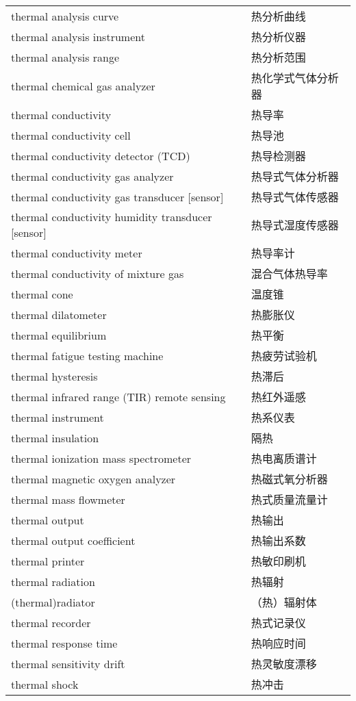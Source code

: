 \documentclass[
]{article}
\begin{document}
\begin{longtable}[]{@{}ll@{}}
thermal analysis curve & 热分析曲线 \\
thermal analysis instrument & 热分析仪器 \\
thermal analysis range & 热分析范围 \\
thermal chemical gas analyzer & 热化学式气体分析器 \\
thermal conductivity & 热导率 \\
thermal conductivity cell & 热导池 \\
thermal conductivity detector (TCD) & 热导检测器 \\
thermal conductivity gas analyzer & 热导式气体分析器 \\
thermal conductivity gas transducer {[}sensor{]} & 热导式气体传感器 \\
thermal conductivity humidity transducer {[}sensor{]} &
热导式湿度传感器 \\
thermal conductivity meter & 热导率计 \\
thermal conductivity of mixture gas & 混合气体热导率 \\
thermal cone & 温度锥 \\
thermal dilatometer & 热膨胀仪 \\
thermal equilibrium & 热平衡 \\
thermal fatigue testing machine & 热疲劳试验机 \\
thermal hysteresis & 热滞后 \\
thermal infrared range (TIR) remote sensing & 热红外遥感 \\
thermal instrument & 热系仪表 \\
thermal insulation & 隔热 \\
thermal ionization mass spectrometer & 热电离质谱计 \\
thermal magnetic oxygen analyzer & 热磁式氧分析器 \\
thermal mass flowmeter & 热式质量流量计 \\
thermal output & 热输出 \\
thermal output coefficient & 热输出系数 \\
thermal printer & 热敏印刷机 \\
thermal radiation & 热辐射 \\
(thermal)radiator & （热）辐射体 \\
thermal recorder & 热式记录仪 \\
thermal response time & 热响应时间 \\
thermal sensitivity drift & 热灵敏度漂移 \\
thermal shock & 热冲击 \\

\end{longtable}
\end{document}
